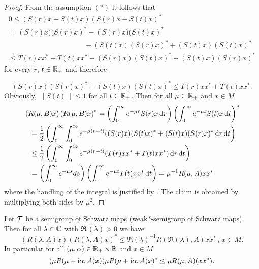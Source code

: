 \begin{proof}
From the assumption $ (*) $ it follows that
\begin{multline*}
	0 	 \leq \left( S(r)x - S(t)x \right) \left( S(r)x - S(t)x \right)^{*} {} \\
		  = \left( S(r)x)(S(r)x \right)^{*} - \left( S(r)x)(S(t)x \right)^{*} \\
		 \phantom{(S(r)x)(S(r)x)^{*}} - (S(t)x)(S(r)x)^{*} + (S(t)x)(S(t)x)^{*}  \\
		\leq T(r)xx^{*} + T(t)xx^{*}   - (S(r)x)(S(t)x)^{*} -  
		   (S(t)x)(S(r)x)^{*}
\end{multline*}
for every $ r $, $ t \in \mathbb{R}_{+} $ and therefore

\[
	(S(r)x)(S(r)x)^{*} + (S(t)x)(S(t)x)^{*} \leq T(r)xx^{*} + T(t)xx^{*} .
\]
Obviously, $ \| S(t)\| \leq 1 $ for all $ t \in \mathbb{R}_{+} $.
Then for all $ \mu \in \mathbb{R}_{+} $ and $ x \in M $
\begin{align*}
	 {}& \left( R(\mu,B)x  \right) \left( R(\mu,B)x \right)^{*} 
		= \left( \int_{0}^\infty e^{-\mu r}S(r)x \mathop{}\!\mathrm{d}{r} \right)
			\left( \int_{0}^\infty e^{-\mu t}S(t)x \mathop{}\!\mathrm{d}{t} \right)^{*}   \\
	&\phantom{=}= \frac{1}{2} \left( \int_{0}^\infty \int_{0}^\infty e^{-\mu(r+t)} ((S(r)x)(S(t)x)^{*}  
			+ (S(t)x)(S(r)x)^{*}  \mathop{}\!\mathrm{d}{r} \mathop{}\!\mathrm{d}{t} \right) \\
	&\phantom{=}\leq \frac{1}{2} \left(\int_{0}^\infty \int_{0}^\infty e^{-\mu(r+t)} (T(r)xx^{*} + T(t)xx^{*})  			\mathop{}\!\mathrm{d}{r} \mathop{}\!\mathrm{d}{t} \right)\\
	&\phantom{=}= \left( \int_{0}^\infty e^{-\mu s} ds \right)
			\left( \int_{0}^\infty e^{-\mu t}T(t)xx^{*} \mathop{}\!\mathrm{d}{t} \right) 
				= \mu^{-1}R(\mu,A)xx^{*}
\end{align*}
where the handling of the integral is justified by \citet[Chap. V, §8, n° 4, Proposition 9]{bourbaki:1955}.
The claim is obtained by multiplying both sides by $\mu^{2} $. 
\end{proof}
\begin{corollary}\label{cor:d1-2.2}
Let $ \mathcal{T} $ be a semigroup of Schwarz maps (\resp weak*-semigroup of Schwarz maps).
Then for all $ \lambda \in \mathbb{C} $ with $ \Re \, (\lambda) > 0 $ we have
\[
	\left( R(\lambda,A)x \right) \left( R(\lambda,A)x \right)^{*} 
		\leq \Re(\lambda)^{-1} R(\Re(\lambda),A)xx^{*} \, , \, x \in M .
\]
In particular for all $ (\mu,\alpha) \in \mathbb{R}_{+} \times \mathbb{R} $ and $ x \in M $
\[
(\mu R(\mu+\mathrm{i} \alpha,A)x)(\mu R(\mu + \mathrm{i} \alpha,A)x)^{*} \leq \mu R(\mu,A)(xx^{*}).
\]
\end{corollary}
